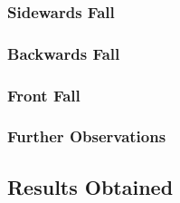 \subsubsection{Sidewards Fall}\label{subsubsec:sidewards-fall}

\subsubsection{Backwards Fall}\label{subsubsec:backwards-fall}

\subsubsection{Front Fall}\label{subsubsec:front-fall}

\subsubsection{Further Observations}\label{subsubsec:further-observations}

\subsection{Results Obtained}\label{subsec:summary-results}

